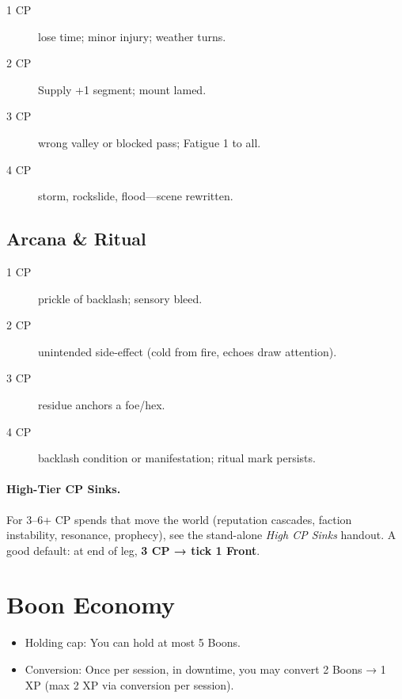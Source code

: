 \begin{description}
\item[1 CP] lose time; minor injury; weather turns.
\item[2 CP] Supply +1 segment; mount lamed.
\item[3 CP] wrong valley or blocked pass; Fatigue 1 to all.
\item[4 CP] storm, rockslide, flood---scene rewritten.
\end{description}

\subsection{Arcana \& Ritual}

\begin{description}
\item[1 CP] prickle of backlash; sensory bleed.
\item[2 CP] unintended side-effect (cold from fire, echoes draw attention).
\item[3 CP] residue anchors a foe/hex.
\item[4 CP] backlash condition or manifestation; ritual mark persists.
\end{description}

\paragraph{High-Tier CP Sinks.}
For 3–6+ CP spends that move the world (reputation cascades, faction instability, resonance, prophecy), see the stand-alone \emph{High CP Sinks} handout. A good default: at end of leg, \textbf{3 CP → tick 1 Front}.

\section{Boon Economy}

\begin{itemize}
    \item Holding cap: You can hold at most 5 Boons.
    \item Conversion: Once per session, in downtime, you may convert 2 Boons → 1 XP (max 2 XP via conversion per session).
\end{itemize}

